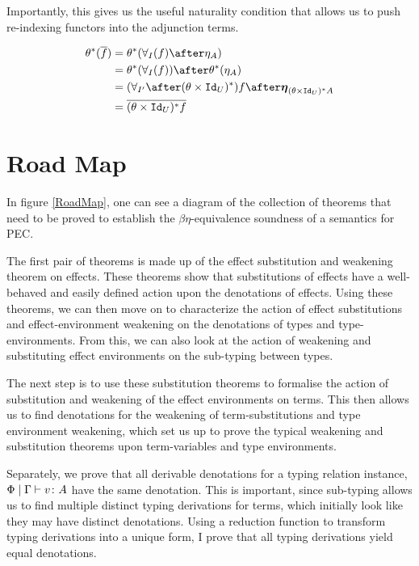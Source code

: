 \documentclass{Report}
\begin{document}
    Importantly, this gives us the useful naturality condition that allows us to push re-indexing functors into the adjunction terms.

    \begin{align}\label{NaturalityCondition}
        \theta\star(\bar{f}) & = \theta\star(\allI(f)\after\eta_A)\\
        & = \theta\star(\allI(f))\after\theta\star(\eta_A)\\
        & =  (\allII\after(\theta\times\Id{U})\star)f \after\unit{(\theta\times\Id{U})\star A}\\
        & = \bar{(\theta\times\Id{U})\star f}\\
    \end{align}

\section{Road Map}
In figure \ref{RoadMap}, one can see a diagram of the collection of theorems that need to be proved to establish the $\beta\eta$-equivalence soundness of a semantics for PEC.


The first pair of theorems is made up of the effect substitution and weakening theorem on effects. These theorems show that substitutions of effects have a well-behaved and easily defined action upon the denotations of effects. Using these theorems, we can then move on to characterize the action of effect substitutions and effect-environment weakening on the denotations of types and type-environments. From this, we can also look at the action of weakening and substituting effect environments on the sub-typing between types.

The next step is to use these substitution theorems to formalise the action of substitution and weakening of the effect environments on terms. This then allows us to find denotations for the weakening of term-substitutions and type environment weakening, which set us up to prove the typical weakening and substitution theorems upon term-variables and type environments. 

Separately, we prove that all derivable denotations for a typing relation instance, $\Phi\mid\Gamma \vdash v \colon A$ have the same denotation. This is important, since sub-typing allows us to find multiple distinct typing derivations for terms, which initially look like they may have distinct denotations. Using a reduction function to transform typing derivations into a unique form, I prove that all typing derivations yield equal denotations.
\end{document}

